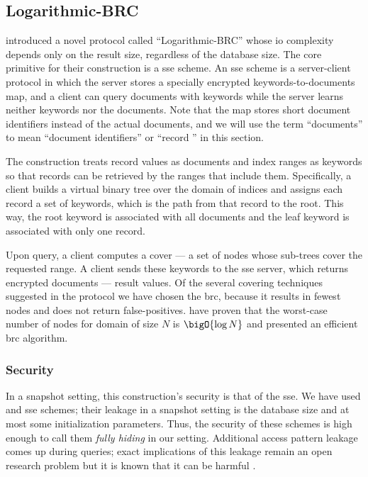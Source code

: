 \subsection{Logarithmic-BRC \texorpdfstring{\cite{practical-range-search}}{}}

	\textcite{practical-range-search} introduced a novel protocol called ``Logarithmic-BRC'' whose \acrshort{io} complexity depends only on the result size, regardless of the database size.
	The core primitive for their construction is a \acrfull{sse} scheme.
	An \acrshort{sse} scheme is a server-client protocol in which the server stores a specially encrypted keywords-to-documents map, and a client can query documents with keywords while the server
	learns neither keywords nor the documents.
	Note that the map stores short document identifiers instead of the actual documents, and we will use the term ``documents'' to mean ``document identifiers'' or ``record '' in this section.

	The construction treats record values as documents and index ranges as keywords so that records can be retrieved by the ranges that include them.
	Specifically, a client builds a virtual binary tree over the domain of indices and assigns each record a set of keywords, which is the path from that record to the root.
	This way, the root keyword is associated with all documents and the leaf keyword is associated with only one record.

	Upon query, a client computes a cover --- a set of nodes whose sub-trees cover the requested range.
	A client sends these keywords to the \acrshort{sse} server, which returns encrypted documents --- result values.
	Of the several covering techniques suggested in the protocol \cite{practical-range-search} we have chosen the \acrfull{brc}, because it results in fewest nodes and does not return false-positives.
	\textcite{brc} have proven that the worst-case number of nodes for domain of size $N$ is $\bigO{\log N}$ and presented an efficient \acrshort{brc} algorithm.

	\subsubsection{Security}

		In a snapshot setting, this construction's security is that of the \acrshort{sse}.
		We have used \cite{cjjkrs-13} and \cite{cjjjkrs-14} \acrshort{sse} schemes; their leakage in a snapshot setting is the database size and at most some initialization parameters.
		Thus, the security of these schemes is high enough to call them \emph{fully hiding} in our setting.
		Additional access pattern leakage comes up during queries; exact implications of this leakage remain an open research problem but it is known that it can be harmful \cite{generic-attacks-kellaris}.

